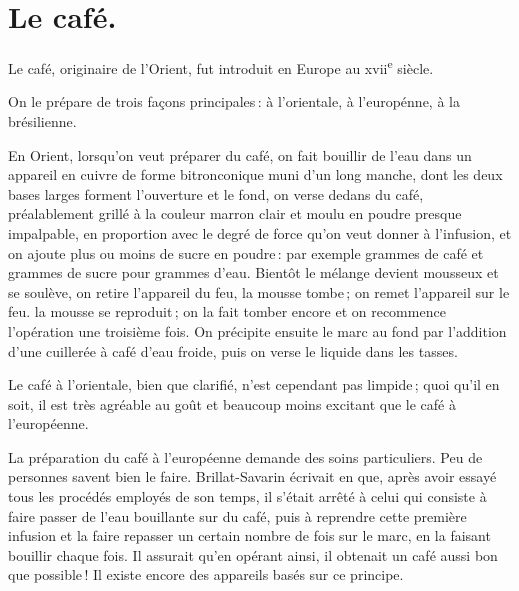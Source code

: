 \sk

\bigskip
\bigskip

\section*{\centering Le café.}
{}

Le café, originaire de l'Orient, fut introduit en Europe au {\sc
xvii}\textsuperscript{e} siècle.

On le prépare de trois façons principales : à l’orientale, à l'europénne, à la
brésilienne.

\sk

En Orient, lorsqu'on veut préparer du café, on fait bouillir de l'eau dans un
appareil en cuivre de forme bitronconique muni d'un long manche, dont les deux
bases larges forment l'ouverture et le fond, on verse dedans du café,
préalablement grillé à la couleur marron clair et moulu en poudre presque
impalpable, en proportion avec le degré de force qu'on veut donner
à l'infusion, et on ajoute plus ou moins de sucre en poudre : par exemple
{\mmm} grammes de café et {\mmm} grammes de sucre pour
{\mmm} grammes d'eau. Bientôt le mélange devient mousseux et se soulève,
on retire l'appareil du feu, la mousse tombe ; on remet l'appareil sur le feu.
la mousse se reproduit ; on la fait tomber encore et on recommence l'opération
une troisième fois. On précipite ensuite le marc au fond par l'addition d'une
cuillerée à café d'eau froide, puis on verse le liquide dans les tasses.

Le café à l'orientale, bien que clarifié, n'est cependant pas limpide ; quoi qu'il en
soit, il est très agréable au goût et beaucoup moins excitant que le café à
l'européenne.

\sk

La préparation du café à l'européenne demande des soins particuliers. Peu de
personnes savent bien le faire. Brillat-Savarin écrivait en {\mmm} que,
après avoir essayé tous les procédés employés de son temps, il s'était arrêté
à celui qui consiste à faire passer de l’eau bouillante sur du café, puis
à reprendre cette première infusion et la faire repasser un certain nombre de
fois sur le marc, en la faisant bouillir chaque fois. Il assurait qu'en opérant
ainsi, il obtenait un café aussi bon que possible ! Il existe encore des
appareils basés sur ce principe.

